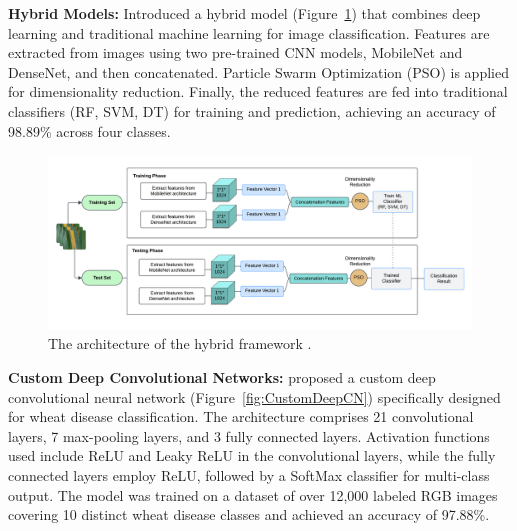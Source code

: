 \textbf{Hybrid Models:} \parencite{nagpal2024hybrid} Introduced a hybrid model (Figure~\ref{fig:hybridframework}) that combines deep learning and traditional machine learning for image classification. Features are extracted from images using two pre-trained CNN models, MobileNet and DenseNet, and then concatenated. Particle Swarm Optimization (PSO) is applied for dimensionality reduction. Finally, the reduced features are fed into traditional classifiers (RF, SVM, DT) for training and prediction, achieving an accuracy of 98.89\% across four classes.


\begin{figure}[H] 
    \centering
    \includegraphics[width=1\textwidth]{chapters/chapter3/images/Figure04.png}
    \caption{The architecture of the hybrid framework \parencite{nagpal2024hybrid}.}
    \label{fig:hybridframework}
\end{figure}









\textbf{Custom Deep Convolutional Networks:} \parencite{goyal2021leaf} proposed a custom deep convolutional neural network (Figure~\ref{fig:CustomDeepCN}) specifically designed for wheat disease classification. The architecture comprises 21 convolutional layers, 7 max-pooling layers, and 3 fully connected layers. Activation functions used include ReLU and Leaky ReLU in the convolutional layers, while the fully connected layers employ ReLU, followed by a SoftMax classifier for multi-class output. The model was trained on a dataset of over 12,000 labeled RGB images covering 10 distinct wheat disease classes and achieved an accuracy of 97.88\%. 

